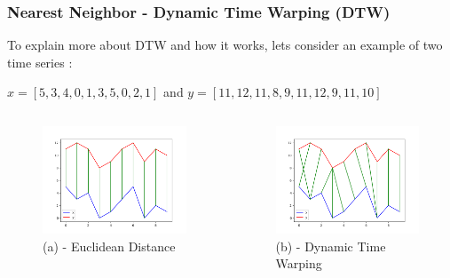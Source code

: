 \documentclass{beamer}
\begin{document}
\begin{frame}
\frametitle{Nearest Neighbor - Dynamic Time Warping (DTW)}
To explain more about DTW and how it works, lets consider an example of two time series :
\begin{example}
$ x = [5,3,4,0,1,3,5,0,2,1] $ and $ y = [11,12,11,8,9,11,12,9,11,10] $
\begin{columns}
\centering
\begin{figure}
\centering
\includegraphics[scale=0.3]{ED_TS.png}
\caption{(a) - Euclidean Distance}
\end{figure}
\centering
\begin{figure}
\includegraphics[scale=0.3]{DTW_TS.png}
\caption{(b) - Dynamic Time Warping}
\end{figure}
\end{columns}
\end{example}
\end{frame}
\end{document}
